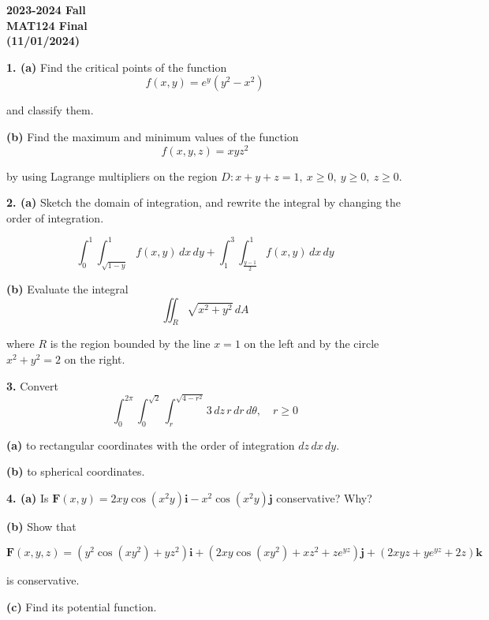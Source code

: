 \documentclass{article}
\begin{document}
\pagestyle{empty}
\large

\begin{center}
\textbf{2023-2024 Fall \\MAT124 Final\\(11/01/2024)}
\end{center}

\textbf{1. (a)} Find the critical points of the function
\[f(x,y)={e}^y\left(y^2-x^2\right)\]

and classify them.

\textbf{(b)} Find the maximum and minimum values of the function
\[f(x,y,z)=xyz^2\]

by using Lagrange multipliers on the region $D:x+y+z=1,\:x\geq0,\:y\geq0,\:z\geq0$.

\vspace{1em}

\textbf{2. (a)} Sketch the domain of integration, and rewrite the integral by changing the order of integration.

\[\int_0^1\int_{\sqrt{1-y}}^1f(x,y)\,dx\,dy+\int_1^3\int_{\textstyle\frac{y-1}2}^1f(x,y)\,dx\,dy\]

\textbf{(b)} Evaluate the integral
\[\iint_R\sqrt{x^2+y^2}\,dA\]

where $R$ is the region bounded by the line $x=1$ on the left and by the circle $x^2+y^2=2$ on the right.

\vspace{1em}

\textbf{3.} Convert
\[\int_0^{2\pi}\int_0^{\sqrt2}\int_r^{\sqrt{4-r^2}}3\,dz\,r\,dr\,d\theta,\quad r\geq0\]

\textbf{(a)} to rectangular coordinates with the order of integration $dz\,dx\,dy$.

\textbf{(b)} to spherical coordinates.

\vspace{1em}

\textbf{4. (a)} Is $\mathbf{F}(x,y)=2xy\cos\left(x^2y\right)\mathbf{i}-x^2\cos\left(x^2y\right)\mathbf{j}$ conservative? Why?

\textbf{(b)} Show that

\[\mathbf{F}(x,y,z)=\left(y^2\cos\left(xy^2\right)+yz^2\right)\mathbf{i}+\left(2xy\cos\left(xy^2\right)+xz^2+z{e}^{yz}\right)\mathbf{j}+\left(2xyz+y{e}^{yz}+2z\right)\mathbf{k}\]

is conservative.

\textbf{(c)} Find its potential function.

\newpage
\end{document}
